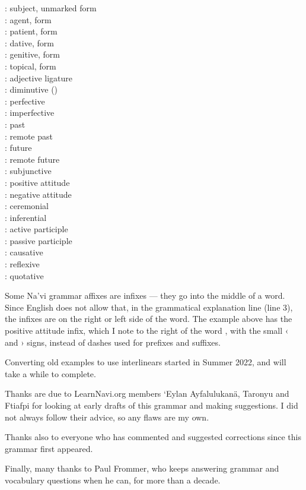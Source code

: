 \begin{multicols}{3}
\noindent{}: subject, unmarked form \\
: agent,  form \\
: patient,  form \\
: dative,  form \\
: genitive,  form \\
: topical,  form \\
: adjective  ligature\\
: diminutive () \\
: perfective \\
: imperfective \\
: past \\
: remote past \\
: future \\
: remote future \\
: subjunctive \\
: positive attitude \\
: negative attitude \\
: ceremonial \\
: inferential \\
: active participle \\
: passive participle \\
: causative \\
: reflexive \\
: quotative 
\end{multicols}

\noindent Some Na'vi grammar affixes are infixes — they go into the
middle of a word.  Since English does not allow that, in the
grammatical explanation line (line 3), the infixes are on the right or
left side of the word.  The example above has the positive attitude
infix, which I note to the right of the word , with the small ‹
and › signs, instead of dashes used for prefixes and suffixes.

Converting old examples to use interlinears started in Summer 2022,
and will take a while to complete.


\vfill
Thanks are due to LearnNavi.org members `Eylan Ayfalulukanä, Taronyu
and Ftiafpi for looking at early drafts of this grammar and making
suggestions.  I did not always follow their advice, so any flaws are
my own.

Thanks also to everyone who has commented and suggested corrections
since this grammar first appeared.

Finally, many thanks to Paul Frommer, who keeps answering grammar
and vocabulary questions when he can, for more than a decade.

\bigskip
